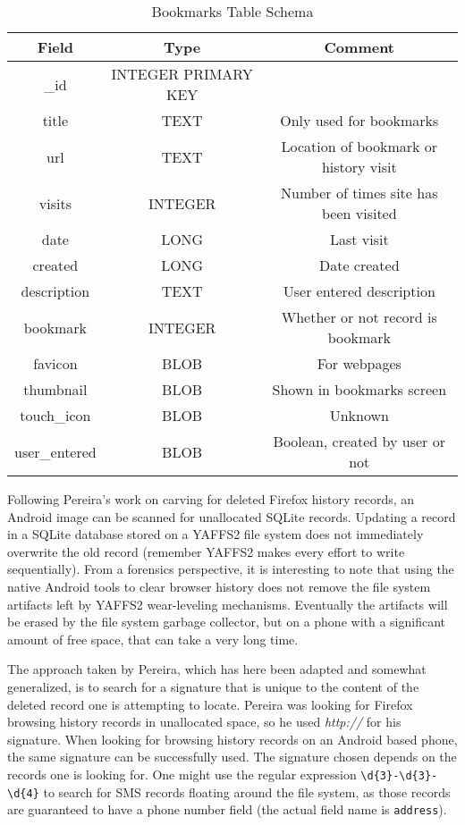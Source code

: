 \vspace{0.1in}
\begin{table}[htb]
\begin {center}
\begin{tabular}{| c | c | c |}
\hline
\textbf{Field} & \textbf{Type} & \textbf{Comment} \\
\hline
\_id & INTEGER PRIMARY KEY & \\
title & TEXT  &  Only used for bookmarks \\
url & TEXT  & Location of bookmark or history visit \\
visits & INTEGER  & Number of times site has been visited \\
date & LONG  &  Last visit \\
created & LONG &  Date created \\
description & TEXT &  User entered description \\
bookmark & INTEGER & Whether or not record is bookmark \\
favicon & BLOB &  For webpages \\
thumbnail & BLOB &  Shown in bookmarks screen \\
touch\_icon & BLOB &  Unknown \\
user\_entered & BLOB & Boolean, created by user or not \\
\hline
\end{tabular}
\end{center}
\caption{Bookmarks Table Schema}
\label{tab:bookmarkschema}
\end{table}

Following Pereira's work on carving for deleted Firefox history records, an Android image can be scanned for unallocated SQLite
records.  Updating a record in a SQLite database stored on a YAFFS2 file system does not immediately overwrite the old record
(remember YAFFS2 makes every effort to write sequentially).  From a forensics perspective, it is interesting to note that using the
native Android tools to clear browser history does not remove the file system artifacts left by YAFFS2 wear-leveling mechanisms.
Eventually the artifacts will be erased by the file system garbage collector, but on a phone with a significant amount of free space,
that can take a very long time.

The approach taken by Pereira, which has here been adapted and somewhat generalized, is to search for a signature that is unique to
the content of the deleted record one is attempting to locate.  Pereira was looking for Firefox browsing history records in
unallocated space, so he used \emph{http://} for his signature.  When looking for browsing history records on an Android based
phone, the same signature can be successfully used.  The signature chosen depends on the records one is looking for.  One might use
the regular expression \verb|\d{3}-\d{3}-\d{4}| to search for SMS records floating around the file system, as those records are guaranteed
to have a phone number field (the actual field name is \texttt{address}). 


